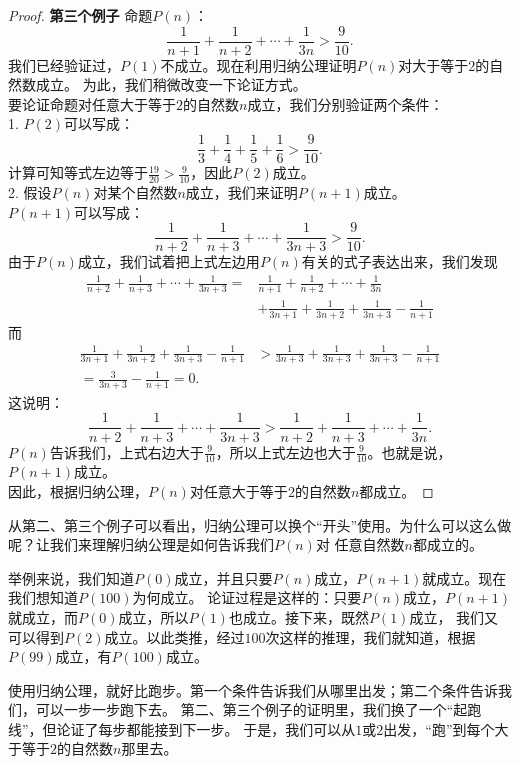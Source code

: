 \begin{proof}{\textbf{第三个例子 }}
    命题$P(n)$：
    $$ \frac{1}{n+1} + \frac{1}{n+2} + \cdots + \frac{1}{3n} > \frac{9}{10}. $$
    我们已经验证过，$P(1)$不成立。现在利用归纳公理证明$P(n)$对大于等于$2$的自然数成立。
    为此，我们稍微改变一下论证方式。\\
    要论证命题对任意大于等于$2$的自然数$n$成立，我们分别验证两个条件：\\
    1. $P(2)$可以写成：
    $$\frac13 + \frac14 + \frac15 + \frac16 > \frac{9}{10}.$$
    计算可知等式左边等于$\frac{19}{20} > \frac{9}{10}$，因此$P(2)$成立。\\
    2. 假设$P(n)$对某个自然数$n$成立，我们来证明$P(n+1)$成立。\\
    $P(n+1)$可以写成：
    $$ \frac{1}{n+2} + \frac{1}{n+3} + \cdots + \frac{1}{3n+3} > \frac{9}{10}. $$
    由于$P(n)$成立，我们试着把上式左边用$P(n)$有关的式子表达出来，我们发现
    \begin{align*}
        \frac{1}{n+2} + \frac{1}{n+3} + \cdots + \frac{1}{3n+3} =& \frac{1}{n+1} + \frac{1}{n+2} + \cdots + \frac{1}{3n}  \\
        &+ \frac{1}{3n+1} + \frac{1}{3n+2} + \frac{1}{3n+3} - \frac{1}{n+1}  
    \end{align*}
    而
    \begin{align*}
        \frac{1}{3n+1} + \frac{1}{3n+2} + \frac{1}{3n+3} - \frac{1}{n+1} &>  \frac{1}{3n+3} + \frac{1}{3n+3} + \frac{1}{3n+3} - \frac{1}{n+1}  \\
        = \frac{3}{3n+3} - \frac{1}{n+1} = 0.  
    \end{align*}
    这说明：
    $$ \frac{1}{n+2} + \frac{1}{n+3} + \cdots + \frac{1}{3n+3} > \frac{1}{n+2} + \frac{1}{n+3} + \cdots + \frac{1}{3n}. $$
    $P(n)$告诉我们，上式右边大于$\frac{9}{10}$，所以上式左边也大于$\frac{9}{10}$。也就是说，$P(n+1)$成立。\\
    因此，根据归纳公理，$P(n)$对任意大于等于$2$的自然数$n$都成立。    
\end{proof}
从第二、第三个例子可以看出，归纳公理可以换个“开头”使用。为什么可以这么做呢？让我们来理解归纳公理是如何告诉我们$P(n)$对
任意自然数$n$都成立的。

举例来说，我们知道$P(0)$成立，并且只要$P(n)$成立，$P(n+1)$就成立。现在我们想知道$P(100)$为何成立。
论证过程是这样的：只要$P(n)$成立，$P(n+1)$就成立，而$P(0)$成立，所以$P(1)$也成立。接下来，既然$P(1)$成立，
我们又可以得到$P(2)$成立。以此类推，经过$100$次这样的推理，我们就知道，根据$P(99)$成立，有$P(100)$成立。

使用归纳公理，就好比跑步。第一个条件告诉我们从哪里出发；第二个条件告诉我们，可以一步一步跑下去。
第二、第三个例子的证明里，我们换了一个“起跑线”，但论证了每步都能接到下一步。
于是，我们可以从$1$或$2$出发，“跑”到每个大于等于$2$的自然数$n$那里去。

